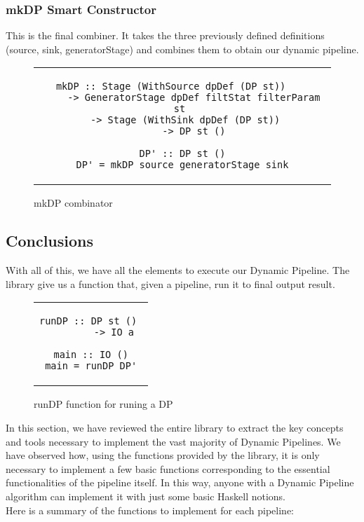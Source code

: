 \subsubsection*{mkDP Smart Constructor}
This is the final combiner. It takes the three previously defined definitions (source, sink, generatorStage) and combines them to obtain our dynamic pipeline.
\begin{figure}[H]
    \begin{tabular}{c}
        \begin{lstlisting}
mkDP :: Stage (WithSource dpDef (DP st))	
    -> GeneratorStage dpDef filtStat filterParam st	
    -> Stage (WithSink dpDef (DP st))	
    -> DP st ()

DP' :: DP st ()
DP' = mkDP source generatorStage sink
        \end{lstlisting}
    \end{tabular}
    \caption[{[Code]} mkDP]{mkDP combinator}
    \label{fig:HC13}
\end{figure}
\subsection{Conclusions}
With all of this, we have all the elements to execute our Dynamic Pipeline.
The library give us a function that, given a pipeline, run it to final output result.
\begin{figure}[H]
    \begin{tabular}{c}
        \begin{lstlisting}
runDP :: DP st () 
        -> IO a
    
main :: IO ()
main = runDP DP'
        \end{lstlisting}
    \end{tabular}
    \caption[{[Code]} runDP]{runDP function for runing a DP}
    \label{fig:HC14}
\end{figure}

In this section, we have reviewed the entire library to extract the key concepts and tools necessary to implement the vast majority of Dynamic Pipelines.
We have observed how, using the functions provided by the library, it is only necessary to implement a few basic functions corresponding to the essential functionalities of the pipeline itself.
In this way, anyone with a Dynamic Pipeline algorithm can implement it with just some basic Haskell notions. \\

Here is a summary of the functions to implement for each pipeline:


